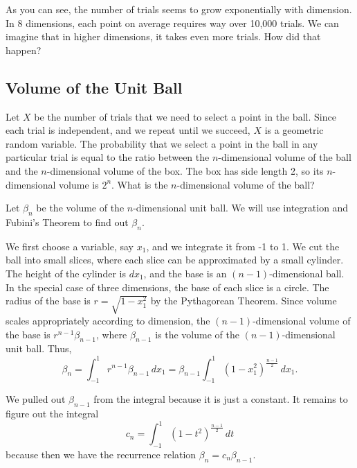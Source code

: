 \documentclass{article}
\begin{document}

As you can see, the number of trials seems to grow exponentially with dimension. In 8 dimensions, each point on average requires way over 10,000 trials. We can imagine that in higher dimensions, it takes even more trials. How did that happen?

\subsection{Volume of the Unit Ball}

Let $X$ be the number of trials that we need to select a point in the ball. Since each trial is independent, and we repeat until we succeed, $X$ is a geometric random variable. The probability that we select a point in the ball in any particular trial is equal to the ratio between the $n$-dimensional volume of the ball and the $n$-dimensional volume of the box. The box has side length 2, so its $n$-dimensional volume is $2^n$. What is the $n$-dimensional volume of the ball?


Let $\beta_n$ be the volume of the $n$-dimensional unit ball. We will use integration and Fubini's Theorem to find out $\beta_n$.

We first choose a variable, say $x_1$, and we integrate it from -1 to 1. We cut the ball into small slices, where each slice can be approximated by a small cylinder. The height of the cylinder is $dx_1$, and the base is an $(n-1)$-dimensional ball. In the special case of three dimensions, the base of each slice is a circle. The radius of the base is $r = \sqrt{1 - x_1^2}$ by the Pythagorean Theorem. Since volume scales appropriately according to dimension, the $(n-1)$-dimensional volume of the base is $r^{n-1} \beta_{n-1}$, where $\beta_{n-1}$ is the volume of the $(n-1)$-dimensional unit ball. Thus,
\[
  \beta_n = \int_{-1}^1 r^{n-1} \beta_{n-1} \, dx_1 = \beta_{n-1} \int_{-1}^1 (1 - x_1^2)^{\frac{n-1}{2}} \, dx_1.
\]

We pulled out $\beta_{n-1}$ from the integral because it is just a constant. It remains to figure out the integral
\[
  c_n = \int_{-1}^1 (1 - t^2)^{\frac{n-1}{2}} \, dt
\]
because then we have the recurrence relation $\beta_n = c_n \beta_{n - 1}$.
\end{document}
